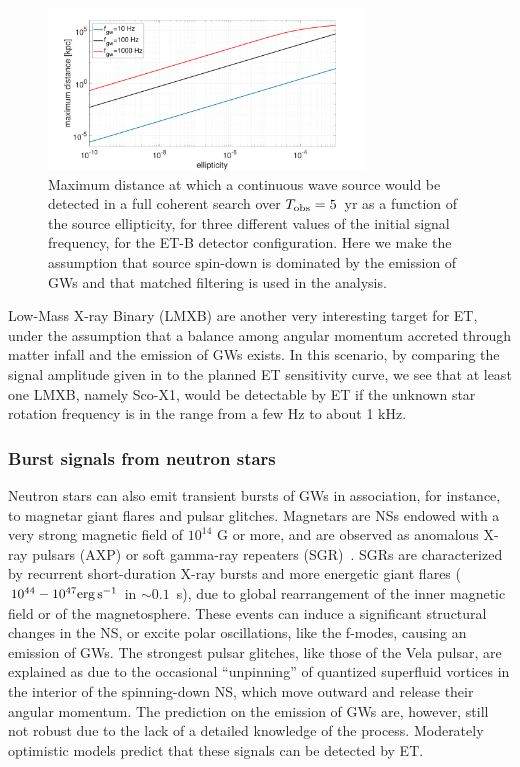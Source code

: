 \begin{figure}[t]
\centering
\includegraphics[width=0.75\textwidth]{Figures/ETB_maxdistance-eps-converted-to.pdf}
\caption{Maximum distance at which a continuous wave source would be detected in a full coherent search over $T_{\rm obs}=5$~yr as a function of the source ellipticity, for three different values of the initial signal frequency, for the ET-B detector configuration. Here we make the assumption that source spin-down is dominated by the emission of GWs and that matched filtering is used in the analysis.
}
\label{fig:et_eps}
\end{figure} 

Low-Mass X-ray Binary (LMXB) are another very interesting target for ET, under the assumption that a balance among angular momentum accreted through matter infall and the emission of GWs exists. In this scenario, by comparing the signal amplitude given in \cite{Bildsten:1998ey} to the planned ET sensitivity curve, we see   that at least one LMXB, namely Sco-X1, would be detectable by ET if the unknown star rotation frequency is in the range from a few Hz to about 1 kHz.







\subsubsection{Burst signals from neutron stars}
Neutron stars can also emit transient bursts of GWs in association, for instance, to magnetar giant flares and pulsar glitches. Magnetars are NSs endowed with a very strong magnetic field of $10^{14}$ G or more, and are observed as anomalous X-ray pulsars (AXP) or soft gamma-ray repeaters (SGR)~\cite{Duncan:1992hi}. SGRs are characterized by recurrent short-duration X-ray bursts and more energetic giant flares ($10^{44}-10^{47} {\rm erg}\,  {\rm s}^{-1}$ in $\sim 0.1$~s), due to global rearrangement of the inner magnetic field or of the magnetosphere. These events can induce a significant structural changes in the NS,  or excite polar oscillations, like the f-modes, causing an emission of GWs. The
strongest pulsar glitches, like those of the Vela pulsar, are explained as due to the occasional ``unpinning'' of quantized superfluid vortices in the interior of the spinning-down NS, which move outward and release their angular momentum. The prediction on the emission of GWs are, however, still not robust due to the lack of a detailed knowledge of the process. Moderately optimistic models predict that these signals can be detected by ET. 



